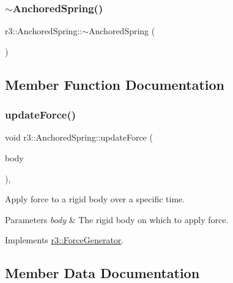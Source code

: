 \subsubsection{\texorpdfstring{$\sim$\+Anchored\+Spring()}{~AnchoredSpring()}}
{\footnotesize\ttfamily r3\+::\+Anchored\+Spring\+::$\sim$\+Anchored\+Spring (\begin{DoxyParamCaption}{ }\end{DoxyParamCaption})\hspace{0.3cm}{\ttfamily [default]}}



\subsection{Member Function Documentation}
\mbox{\label{classr3_1_1_anchored_spring_a56aaf13c1f89f2b45b6cb95bf16a2300}} 
\subsubsection{\texorpdfstring{update\+Force()}{updateForce()}}
{\footnotesize\ttfamily void r3\+::\+Anchored\+Spring\+::update\+Force (\begin{DoxyParamCaption}\item[{\mbox{\hyperlink{classr3_1_1_rigid_body}{Rigid\+Body}} $\ast$}]{body }\end{DoxyParamCaption})\hspace{0.3cm}{\ttfamily [override]}, {\ttfamily [virtual]}}



Apply force to a rigid body over a specific time. 


\begin{DoxyParams}{Parameters}
{\em body} & The rigid body on which to apply force. \\
\hline
\end{DoxyParams}


Implements \mbox{\hyperlink{classr3_1_1_force_generator_a59deb54721cdcc6e33fabfb1f9a3fb27}{r3\+::\+Force\+Generator}}.



\subsection{Member Data Documentation}
\mbox{\label{classr3_1_1_anchored_spring_a1387aec403f6955848fe8c3a28b90a9e}} 
